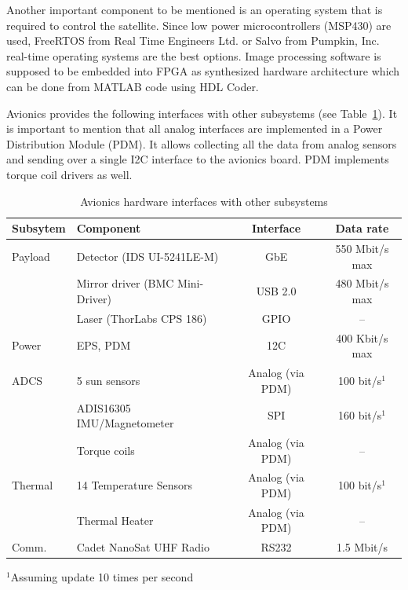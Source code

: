 \documentclass[12pt]{article}
\begin{document}
Another important component to be mentioned is an operating system that is required to control the satellite. Since low power microcontrollers (MSP430) are used, FreeRTOS from Real Time Engineers Ltd. \cite{avionics_RTOS} or Salvo from Pumpkin, Inc. \cite{avionics_pumpkin} real-time operating systems are the best options. Image processing software is supposed to be embedded into FPGA as synthesized hardware architecture which can be done from MATLAB code using HDL Coder.

Avionics provides the following interfaces with other subsystems (see Table~\ref{table:avionics_interfaces}). It is important to mention that all analog interfaces are implemented in a Power Distribution Module (PDM). It allows collecting all the data from analog sensors and sending over a single I2C interface to the avionics board. PDM implements torque coil drivers as well.


\begin{table}[ht]
\caption{Avionics hardware interfaces with other subsystems}
\label{table:avionics_interfaces}
\begin{center}
    \begin{tabular}{| p{2cm} | l | c | c |} \hline
    	Subsytem & Component & Interface & Data rate \\ \hline \hline
    Payload & Detector (IDS UI-5241LE-M) & GbE & 550 Mbit/s max  \\
     & Mirror driver (BMC Mini-Driver) & USB 2.0 & 480 Mbit/s max \\
     & Laser (ThorLabs CPS 186) & GPIO & -- \\ \hline
    Power & EPS, PDM & 12C & 400 Kbit/s max \\ \hline
    ADCS & 5 sun sensors & Analog (via PDM) & 100 bit/s$^1$ \\
     & ADIS16305 IMU/Magnetometer & SPI & 160 bit/s$^1$ \\
     & Torque coils & Analog (via PDM) & -- \\ \hline
    Thermal & 14 Temperature Sensors & Analog (via PDM) & 100 bit/s$^1$ \\
     & Thermal Heater & Analog (via PDM) & -- \\ \hline
    Comm. & Cadet NanoSat UHF Radio & RS232 & 1.5 Mbit/s \\ \hline 
    \end{tabular}
$^1$Assuming update 10 times per second
\end{center}
\end{table}
\end{document}
